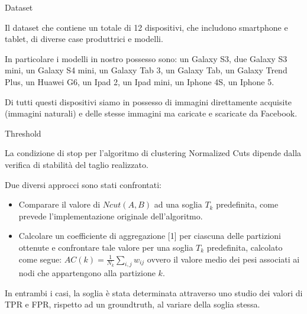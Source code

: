 
\begin{tframe}{Dataset}

Il dataset che contiene un totale di 12 dispositivi, che includono smartphone e tablet, di diverse case produttrici e modelli.

\vspace{0.1in}

In particolare i modelli in nostro possesso sono: un Galaxy S3, due Galaxy S3 mini, un Galaxy S4 mini, un Galaxy Tab 3, un Galaxy Tab, un Galaxy Trend Plus, un Huawei G6, un Ipad 2, un Ipad mini, un Iphone 4S, un Iphone 5. 

\vspace{0.1in}

Di tutti questi dispositivi siamo in possesso di immagini direttamente acquisite (immagini naturali) e delle stesse immagini ma caricate e scaricate da Facebook.


\end{tframe}


\begin{tframe}{Threshold}

La condizione di stop per l'algoritmo di clustering Normalized Cuts dipende dalla verifica di stabilità del taglio realizzato.

\vspace{0.1in}

Due diversi approcci sono stati confrontati:
\begin{itemize}
\item Comparare il valore di $Ncut(A, B)$ ad una soglia $T_{k}$ predefinita, come prevede l'implementazione originale dell'algoritmo.
\item Calcolare un coefficiente di aggregazione [1] per ciascuna delle partizioni ottenute e confrontare tale valore per una soglia $T_{k}$ predefinita, calcolato come segue: $AC(k) = \frac{1}{N_{k}} \sum_{i, j} w_{ij}$ ovvero il valore medio dei pesi associati ai nodi che appartengono alla partizione $k$.
\end{itemize}

\vspace{0.1in}

In entrambi i casi, la soglia è stata determinata attraverso uno studio dei valori di TPR e FPR, rispetto ad un groundtruth, al variare della soglia stessa.

\end{tframe}

